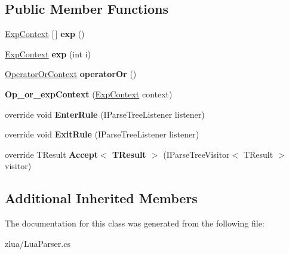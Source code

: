 \subsection*{Public Member Functions}
\begin{DoxyCompactItemize}
\item 
\mbox{\label{classzlua_1_1_lua_parser_1_1_op__or__exp_context_a6c5d30acf9ce19bf46e80e3c978fabd4}} 
\mbox{\hyperlink{classzlua_1_1_lua_parser_1_1_exp_context}{Exp\+Context}} \mbox{[}$\,$\mbox{]} {\bfseries exp} ()
\item 
\mbox{\label{classzlua_1_1_lua_parser_1_1_op__or__exp_context_a41d06e843a959ccf0b5e7b189fd8c0ee}} 
\mbox{\hyperlink{classzlua_1_1_lua_parser_1_1_exp_context}{Exp\+Context}} {\bfseries exp} (int i)
\item 
\mbox{\label{classzlua_1_1_lua_parser_1_1_op__or__exp_context_a72472de21622f12744d5255a98de1466}} 
\mbox{\hyperlink{classzlua_1_1_lua_parser_1_1_operator_or_context}{Operator\+Or\+Context}} {\bfseries operator\+Or} ()
\item 
\mbox{\label{classzlua_1_1_lua_parser_1_1_op__or__exp_context_a7ea25682340a06408ee2c349c6ce94a4}} 
{\bfseries Op\+\_\+or\+\_\+exp\+Context} (\mbox{\hyperlink{classzlua_1_1_lua_parser_1_1_exp_context}{Exp\+Context}} context)
\item 
\mbox{\label{classzlua_1_1_lua_parser_1_1_op__or__exp_context_aacb335c23a09794e122f3f7fe1a08a49}} 
override void {\bfseries Enter\+Rule} (I\+Parse\+Tree\+Listener listener)
\item 
\mbox{\label{classzlua_1_1_lua_parser_1_1_op__or__exp_context_a93b3e7b78f019cf78ec6e99310d6d178}} 
override void {\bfseries Exit\+Rule} (I\+Parse\+Tree\+Listener listener)
\item 
\mbox{\label{classzlua_1_1_lua_parser_1_1_op__or__exp_context_ad8ad5b96758d620dfc28b2d0b06369d9}} 
override T\+Result {\bfseries Accept$<$ T\+Result $>$} (I\+Parse\+Tree\+Visitor$<$ T\+Result $>$ visitor)
\end{DoxyCompactItemize}
\subsection*{Additional Inherited Members}


The documentation for this class was generated from the following file\+:\begin{DoxyCompactItemize}
\item 
zlua/Lua\+Parser.\+cs\end{DoxyCompactItemize}
